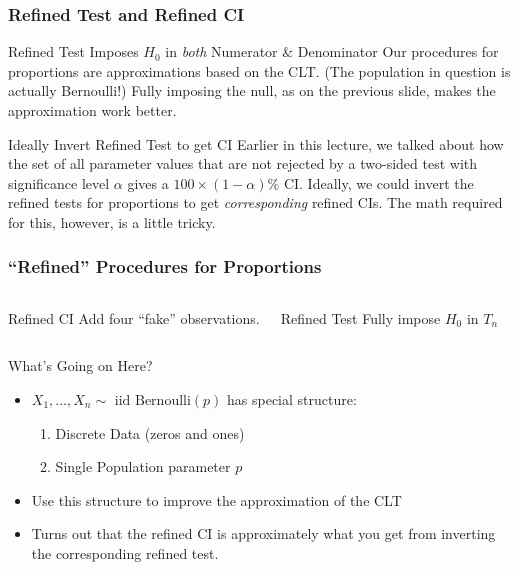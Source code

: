 \documentclass[handout]{beamer}
\begin{document}
\begin{frame}
\frametitle{Refined Test and Refined CI}
\small
\begin{block}{Refined Test Imposes $H_0$ in \emph{both} Numerator \& Denominator}
Our procedures for proportions are approximations based on the CLT. (The population in question is actually Bernoulli!) Fully imposing the null, as on the previous slide, makes the approximation work better.
\end{block}

\pause

\begin{block}{Ideally Invert Refined Test to get CI}
Earlier in this lecture, we talked about how the set of all parameter values that are not rejected by a two-sided test with significance level $\alpha$ gives a $100\times(1-\alpha)\%$ CI. Ideally, we could invert the refined tests for proportions to get \emph{corresponding} refined CIs. The math required for this, however, is a little tricky.
\end{block}

\end{frame}
\begin{frame}
	\frametitle{``Refined'' Procedures for Proportions}
\begin{columns}
	\begin{block}
		{Refined CI}
		Add four ``fake'' observations.
	\end{block}
		\begin{block}
			{Refined Test} Fully impose $H_0$ in $T_n$
		\end{block}
\end{columns}

\vspace{2em}

\begin{block}
	{What's Going on Here?}
		\begin{itemize}
		\item $X_1, \hdots, X_n \sim \mbox{ iid Bernoulli}(p)$ has special structure:
			\begin{enumerate}
				\item Discrete Data (zeros and ones)
				\item Single Population parameter $p$ 
			\end{enumerate}
		\item Use this structure to improve the approximation of the CLT
		\item Turns out that the refined CI is approximately what you get from inverting the corresponding refined test.
	\end{itemize}
\end{block}
\end{frame}
\end{document}
